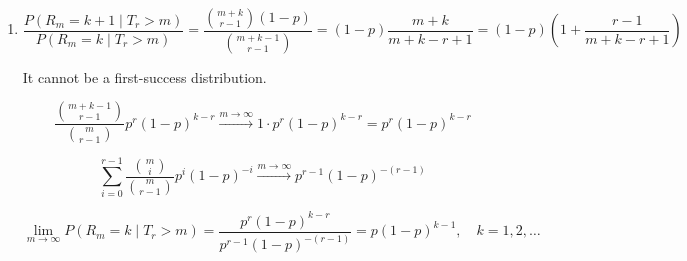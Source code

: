 \documentclass[a4paper]{article}
\begin{document}
\begin{enumerate}
    $$
    P(R_m = k \mid T_r > m) = \frac{P(T_r = m+k)}{P(T_r > m)} = \frac{\binom{m+k-1}{r-1} p^r (1-p)^{m+k-r}}{\sum_{i=0}^{r-1} \binom{m}{i} p^i (1-p)^{m-i}}
    $$

    $$
    P(R_m = k \mid T_r > m) = \sum_{s=0}^{r-1} w_s \cdot P(W_{r-s} = k)
    $$

    and $w_s = P(S = s \mid S < r) = \frac{\binom{m}{s} p^s (1-p)^{m-s}}{\sum_{i=0}^{r-1} \binom{m}{i} p^i (1-p)^{m-i}}, \quad s \in \{0, 1, \dots, r-1\}$.
    
    \item[(b)]
    
    $$
    \frac{P(R_m = k+1 \mid T_r > m)}{P(R_m = k \mid T_r > m)} = \frac{\binom{m+k}{r-1} (1-p)}{\binom{m+k-1}{r-1}} = (1-p) \frac{m+k}{m+k-r+1} = (1-p) \left( 1 + \frac{r-1}{m+k-r+1} \right)
    $$

    It cannot be a first-success distribution.

    $$
    \frac{\binom{m+k-1}{r-1}}{\binom{m}{r-1}} p^r (1-p)^{k-r} \xrightarrow{m \to \infty} 1 \cdot p^r (1-p)^{k-r} = p^r (1-p)^{k-r}
    $$

    $$
    \sum_{i=0}^{r-1} \frac{\binom{m}{i}}{\binom{m}{r-1}} p^i (1-p)^{-i} \xrightarrow{m \to \infty} p^{r-1} (1-p)^{-(r-1)}
    $$

    $$
    \lim_{m \to \infty} P(R_m = k \mid T_r > m) = \frac{p^r (1-p)^{k-r}}{p^{r-1} (1-p)^{-(r-1)}} = p(1-p)^{k-1}, \quad k = 1, 2, \dots
    $$
\end{enumerate}
\end{document}
